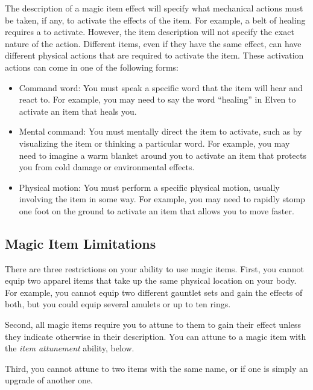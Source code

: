     The description of a magic item effect will specify what mechanical actions must be taken, if any, to activate the effects of the item.
    For example, a belt of healing requires a  to activate.
    However, the item description will not specify the exact nature of the action.
    Different items, even if they have the same effect, can have different physical actions that are required to activate the item.
    These activation actions can come in one of the following forms:
    \begin{itemize}
      \item Command word: You must speak a specific word that the item will hear and react to.
        For example, you may need to say the word ``healing'' in Elven to activate an item that heals you.
      \item Mental command: You must mentally direct the item to activate, such as by visualizing the item or thinking a particular word.
        For example, you may need to imagine a warm blanket around you to activate an item that protects you from cold damage or environmental effects.
      \item Physical motion: You must perform a specific physical motion, usually involving the item in some way.
        For example, you may need to rapidly stomp one foot on the ground to activate an item that allows you to move faster.
    \end{itemize}


  \subsection{Magic Item Limitations}

    There are three restrictions on your ability to use magic items.
    First, you cannot equip two apparel items that take up the same physical location on your body.
    For example, you cannot equip two different gauntlet sets and gain the effects of both, but you could equip several amulets or up to ten rings.

    Second, all magic items require you to attune to them to gain their effect unless they indicate otherwise in their description.
    You can attune to a magic item with the \textit{item attunement} ability, below.

    Third, you cannot attune to two items with the same name, or if one is simply an upgrade of another one.


